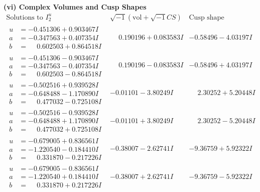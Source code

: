 \documentclass[1p]{elsarticle_modified}
\theoremstyle{definition}
\newcommand{\I}{\sqrt{-1}}
\begin{document}
\newpage\flushleft \textbf{(vi) Complex Volumes and Cusp Shapes}
$$\begin{array}{c|c|c}  
\text{Solutions to }I^u_{2}& \I (\text{vol} + \sqrt{-1}CS) & \text{Cusp shape}\\
 \hline 
\begin{aligned}
u &= -0.451306 + 0.903467 I \\
a &= -0.347563 + 0.407354 I \\
b &= \phantom{-}0.602503 + 0.864518 I\end{aligned}
 & \phantom{-}0.190196 + 0.083583 I & -0.58496 - 4.03197 I \\ \hline\begin{aligned}
u &= -0.451306 - 0.903467 I \\
a &= -0.347563 - 0.407354 I \\
b &= \phantom{-}0.602503 - 0.864518 I\end{aligned}
 & \phantom{-}0.190196 - 0.083583 I & -0.58496 + 4.03197 I \\ \hline\begin{aligned}
u &= -0.502516 + 0.939528 I \\
a &= -0.648488 - 1.170890 I \\
b &= \phantom{-}0.477032 - 0.725108 I\end{aligned}
 & -0.01101 - 3.80249 I & \phantom{-}2.30252 + 5.20448 I \\ \hline\begin{aligned}
u &= -0.502516 - 0.939528 I \\
a &= -0.648488 + 1.170890 I \\
b &= \phantom{-}0.477032 + 0.725108 I\end{aligned}
 & -0.01101 + 3.80249 I & \phantom{-}2.30252 - 5.20448 I \\ \hline\begin{aligned}
u &= -0.679005 + 0.836561 I \\
a &= -1.220540 - 0.184410 I \\
b &= \phantom{-}0.331870 - 0.217226 I\end{aligned}
 & -0.38007 - 2.62741 I & -9.36759 + 5.92322 I \\ \hline\begin{aligned}
u &= -0.679005 - 0.836561 I \\
a &= -1.220540 + 0.184410 I \\
b &= \phantom{-}0.331870 + 0.217226 I\end{aligned}
 & -0.38007 + 2.62741 I & -9.36759 - 5.92322 I \\ \hline\begin{aligned}

\end{aligned}
\end{array}$$
\end{document}
